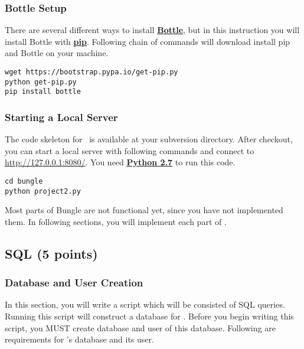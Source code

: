\documentclass[letterpaper,12pt]{report}
\begin{document}
\subsubsection{Bottle Setup}
There are several different ways to install \href{http://bottlepy.org/docs/dev/index.html}{\textbf{Bottle}}, but in this instruction you will install Bottle with \href{https://pypi.python.org/pypi/pip}{\textbf{pip}}. Following chain of commands will download install pip and Bottle on your machine.
\begin{mdframed}
\begin{Verbatim}
wget https://bootstrap.pypa.io/get-pip.py
python get-pip.py
pip install bottle
\end{Verbatim}
\end{mdframed}

\subsubsection{Starting a Local Server}
The code skeleton for \bungle\ is available at your subversion directory. After checkout, you can start a local server with following commands and connect to \url{http://127.0.0.1:8080/}. You need \href{https://www.python.org/download/releases/2.7/}{\textbf{Python 2.7}} to run this code.

\begin{mdframed}
\begin{Verbatim}
cd bungle
python project2.py
\end{Verbatim}
\end{mdframed}

Most parts of Bungle are not functional yet, since you have not implemented them. In following sections, you will implement each part of \bungle.
\newpage
 
\subsection{SQL (5 points)}
\label{sec:sql_tutorial}

\subsubsection{Database and User Creation}
\label{sec:pre_sql_tutorial}
In this section, you will write a script which will be consisted of SQL queries. Running this script will construct a database for \bungle. Before you begin writing this script, you MUST create database and user of this database. Following are requirements for \bungle's database and its user.
\end{document}
